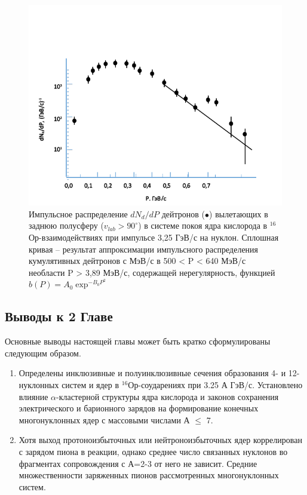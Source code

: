 \documentclass[fontsize=14pt]{scrarticle}
\begin{document}
\begin{figure}[!ht]
\centerline{\includegraphics{picture6.png}}
\caption{Импульсное распределение $dN_{d}/dP$ дейтронов ($\bullet$) вылетающих в заднюю полусферу ($v_{lab}>90^{\circ}$) в системе покоя ядра кислорода в $^{16}$Ор-взаимодействиях при импульсе 3,25 ГэВ/с на нуклон. Сплошная кривая – результат аппроксимации импульсного распределения кумулятивных дейтронов с  МэВ/с в 500 < P < 640 МэВ/с необласти P > 3,89 МэВ/с, содержащей нерегулярность, функцией $b(P) = A_{0}\exp^{-B_{0}P^{2}}$ }
\label{fig6}
\end{figure}

\subsection*{Выводы к 2 Главе}
Основные выводы настоящей главы может быть кратко сформулированы следующим образом.
\begin{enumerate}
    \item Определены инклюзивные и полуинклюзивные сечения образования 4- и 12-нуклонных систем и ядер в $^{16}$Ор-соударениях при 3.25 А ГэВ/с. Установлено влияние $\alpha$-кластерной структуры ядра кислорода и законов сохранения электрического и барионного зарядов на формирование конечных многонуклонных ядер с массовыми числами А $\le$ 7.
    \item Хотя выход протоноизбыточных или нейтроноизбыточных ядер коррелирован с зарядом пиона в реакции, однако среднее число связанных нуклонов во фрагментах сопровождения с А=2-3 от него не зависит. Средние множественности заряженных пионов рассмотренных многонуклонных систем.
\end{enumerate}
\end{document}
